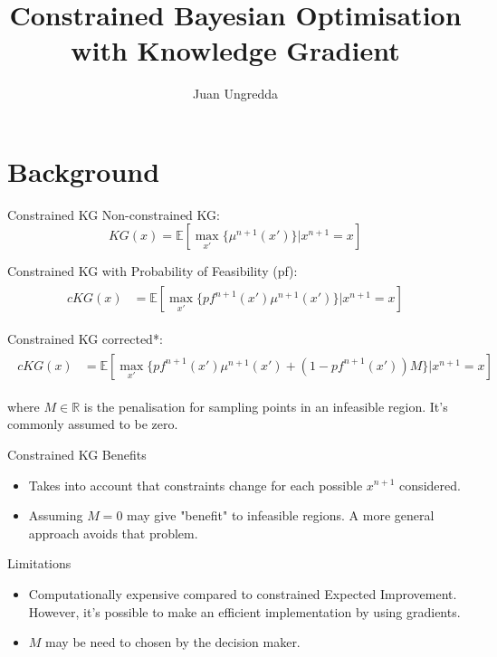 \documentclass{beamer}
\title[]{Constrained Bayesian Optimisation with Knowledge Gradient}
\author[Juan Ungredda]{\small Juan Ungredda}
\institute[]{University of Warwick}
\date{}
\begin{document}


\section{Background}

\begin{frame}{Constrained KG}
Non-constrained KG:
$$KG(x) = \mathbb{E}[\max_{x'}\{\mu^{n+1}(x')\}|x^{n+1}=x]$$

Constrained KG with Probability of Feasibility (pf):
\begin{align*}
\begin{split}
cKG(x) &= \mathbb{E}[\max_{x'}\{pf^{n+1}(x')\mu^{n+1}(x')\}|x^{n+1}=x]
\end{split}
\end{align*}

Constrained KG corrected*:
\begin{align*}
\begin{split}
cKG(x) &= \mathbb{E}[\max_{x'}\{pf^{n+1}(x')\mu^{n+1}(x') + (1-pf^{n+1}(x'))M\}|x^{n+1}=x]
\end{split}
\end{align*}

where $M\in \mathbb{R}$ is the penalisation for sampling points in an infeasible region. It's commonly assumed to be zero.

\end{frame}

\begin{frame}{Constrained KG}
Benefits
\begin{itemize}
	\item Takes into account that constraints change for each possible $x^{n+1}$ considered.
	\item Assuming $M=0$ may give "benefit" to infeasible regions. A more general approach avoids that problem.
\end{itemize}
Limitations
\begin{itemize}
	\item Computationally expensive compared to constrained Expected Improvement. However, it's possible to make an efficient implementation by using gradients.
	\item $M$ may be need to chosen by the decision maker.
\end{itemize}

\end{frame}
\end{document}
